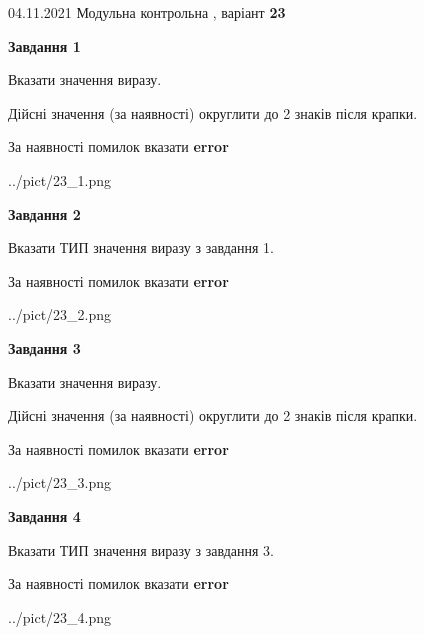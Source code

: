 \documentclass[11pt, ukrainian]{article}
\begin{document}
{04.11.2021 Модульна контрольна , варіант  \No \textbf { 23 }\par}
{
\begin {large}
{\begin {center}\textbf{Завдання 1}\end {center}}\par
Вказати значення виразу. \par
Дійсні значення (за наявності) округлити до 2 знаків після крапки. \par
За наявності помилок вказати \textbf{error}

\begin{center}
	{../pict/23_1.png}
\end{center}
\newpage

{\begin {center}\textbf{Завдання 2}\end {center}}\par
Вказати ТИП значення виразу з завдання 1. \par
За наявності помилок вказати \textbf{error}

\begin{center}
	{../pict/23_2.png}
\end{center}
\newpage

{\begin {center}\textbf{Завдання 3}\end {center}}\par
Вказати значення виразу. \par
Дійсні значення (за наявності) округлити до 2 знаків після крапки. \par
За наявності помилок вказати \textbf{error}

\begin{center}
	{../pict/23_3.png}
\end{center}
\newpage

{\begin {center}\textbf{Завдання 4}\end {center}}\par
Вказати ТИП значення виразу з завдання 3. \par
За наявності помилок вказати \textbf{error}

\begin{center}
	{../pict/23_4.png}
\end{center}
\newpage


\end{large}}
\end{document}
